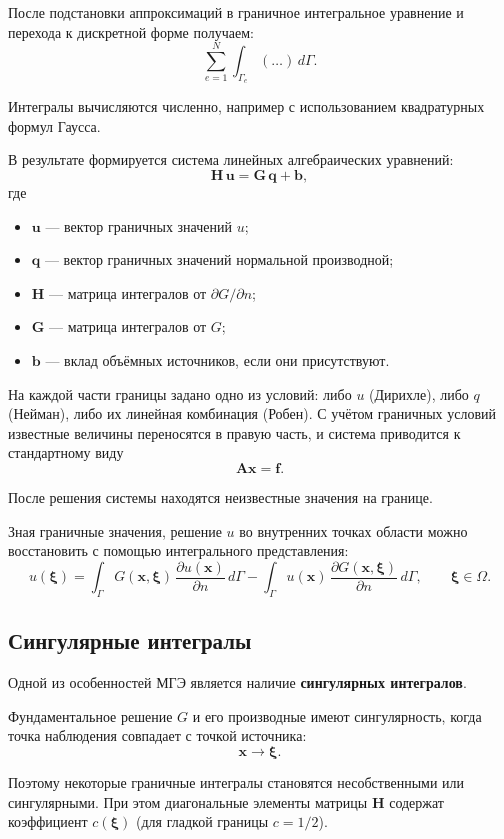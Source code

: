 После подстановки аппроксимаций в граничное интегральное уравнение и перехода к дискретной форме получаем:
$$
\sum_{e=1}^{N}
\int_{\Gamma_e}(\ldots)\,d\Gamma.
$$

Интегралы вычисляются численно, например с использованием квадратурных формул Гаусса.

В результате формируется система линейных алгебраических уравнений:
$$
\mathbf{H}\,\mathbf{u}
=
\mathbf{G}\,\mathbf{q}
+
\mathbf{b},
$$
где
\begin{itemize}
	\item $\mathbf{u}$ --- вектор граничных значений $u$;
	\item $\mathbf{q}$ --- вектор граничных значений нормальной производной;
	\item $\mathbf{H}$ --- матрица интегралов от $\partial G/\partial n$;
	\item $\mathbf{G}$ --- матрица интегралов от $G$;
	\item $\mathbf{b}$ --- вклад объёмных источников, если они присутствуют.
\end{itemize}

На каждой части границы задано одно из условий: либо $u$ (Дирихле), либо $q$ (Нейман), либо их линейная комбинация (Робен). С учётом граничных условий известные величины переносятся в правую часть, и система приводится к стандартному виду
$$
\mathbf{A}\mathbf{x}=\mathbf{f}.
$$

После решения системы находятся неизвестные значения на границе.

Зная граничные значения, решение $u$ во внутренних точках области можно восстановить с помощью интегрального представления:
$$
u(\boldsymbol{\xi})
=
\int_{\Gamma} G(\mathbf{x},\boldsymbol{\xi})\,
\frac{\partial u(\mathbf{x})}{\partial n}
\,d\Gamma
-
\int_{\Gamma} u(\mathbf{x})\,
\frac{\partial G(\mathbf{x},\boldsymbol{\xi})}{\partial n}
\,d\Gamma,
\qquad \boldsymbol{\xi}\in\Omega.
$$

\subsection{Сингулярные интегралы}

Одной из особенностей МГЭ является наличие \textbf{сингулярных интегралов}.

Фундаментальное решение $G$ и его производные имеют сингулярность, когда точка наблюдения совпадает с точкой источника:
$$
\mathbf{x}\rightarrow\boldsymbol{\xi}.
$$

Поэтому некоторые граничные интегралы становятся несобственными или сингулярными. При этом диагональные элементы матрицы $\mathbf{H}$ содержат коэффициент $c(\boldsymbol{\xi})$ (для гладкой границы $c=1/2$).

